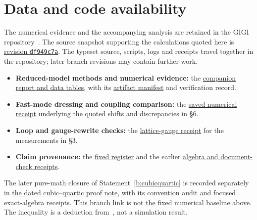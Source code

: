 \section*{Data and code availability}

The numerical evidence and the accompanying analysis are retained in the GIGI repository~\cite{HelikeReport,ClosedSet}.
The source snapshot supporting the calculations quoted here is
\href{https://github.com/nurdymuny/gigi/tree/df949c7a69aae59b873230aabf9ccab7e5821910}{revision \texttt{df949c7a}}.
The typeset source, scripts, logs and receipts travel together in the repository; later branch revisions may contain
further work.

\begin{itemize}
\item \textbf{Reduced-model methods and numerical evidence:}
the \href{https://github.com/nurdymuny/gigi/tree/df949c7a69aae59b873230aabf9ccab7e5821910/docs/papers/helike-quantum-probe}{companion report and data tables},
with its \href{https://github.com/nurdymuny/gigi/blob/df949c7a69aae59b873230aabf9ccab7e5821910/docs/papers/helike-quantum-probe/artifact-manifest.json}{artifact manifest}
and verification record.
\item \textbf{Fast-mode dressing and coupling comparison:}
the \href{https://github.com/nurdymuny/gigi/blob/df949c7a69aae59b873230aabf9ccab7e5821910/research/gigi-m3-20261127/result.json}{saved numerical receipt}
underlying the quoted shifts and discrepancies in \S6.
\item \textbf{Loop and gauge-rewrite checks:}
the \href{https://github.com/nurdymuny/gigi/blob/df949c7a69aae59b873230aabf9ccab7e5821910/research/gigi-lattice-gauge-20261127/result.json}{lattice-gauge receipt}
for the measurements in \S3.
\item \textbf{Claim provenance:}
the \href{https://github.com/nurdymuny/gigi/tree/df949c7a69aae59b873230aabf9ccab7e5821910/docs/research/closed-set-20261127}{fixed register}
and the earlier \href{https://github.com/nurdymuny/gigi/tree/df949c7a69aae59b873230aabf9ccab7e5821910/research/lowest-note-mechanism-20261127}{algebra and document-check receipts}.
\end{itemize}

The later pure-math closure of Statement~\ref{b:cubicquartic} is recorded separately in
\href{https://github.com/nurdymuny/gigi/blob/feat/helike-carrier-geometry-probe/docs/research/h7-cubic-quartic-proof-2026-11-27.md}{the dated cubic--quartic proof note},
with its convention audit and focused exact-algebra receipts. This branch link is not the fixed numerical
baseline above. The inequality is a deduction from~\cite{AustingWheater03}, not a simulation result.

